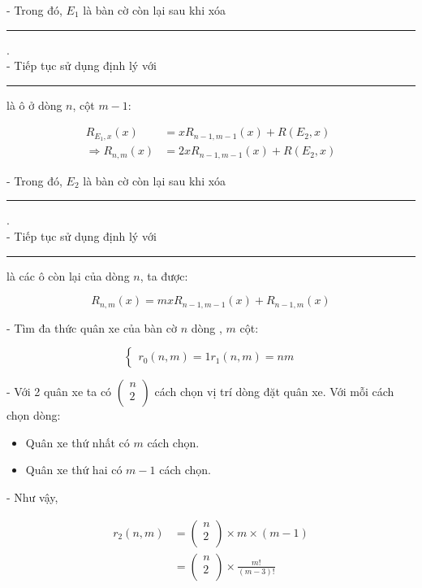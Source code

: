 \documentclass[12pt]{article}
\newcommand\crule[3][black]{\textcolor{#1}{\rule{#2}{#3}}}
\begin{document}
\begin{sloppypar}
- Trong đó, \(E_{1}\) là bàn cờ còn lại sau khi xóa \crule[cyan]{0.3cm}{0.3cm}. \\
- Tiếp tục sử dụng định lý với \crule[cyan]{0.3cm}{0.3cm} là ô ở dòng \(n\), cột \(m-1\): 

\begin{align*}
    R_{E_{1},x}(x) & = xR_{n-1,m-1}(x) + R(E_{2},x) \\
    \Rightarrow R_{n,m}(x) & = 2xR_{n-1,m-1}(x) + R(E_{2},x) 
\end{align*}

- Trong đó, \(E_{2}\) là bàn cờ còn lại sau khi xóa \crule[cyan]{0.3cm}{0.3cm}. \\
- Tiếp tục sử dụng định lý với \crule[cyan]{0.3cm}{0.3cm} là các ô còn lại của dòng \(n\), ta được:

\begin{equation*}
    R_{n,m}(x) = mxR_{n-1,m-1}(x) + R_{n-1,m}(x)
\end{equation*}

- Tìm đa thức quân xe của bàn cờ \(n\) dòng , \(m\) cột:

\[
    \begin{cases}
        r_{0}(n,m) = 1
        r_{1}(n,m) = nm
    \end{cases}
    \]

- Với 2 quân xe ta có \( \begin{pmatrix} n \\ 2 \\ \end{pmatrix} \) cách chọn vị trí dòng đặt quân xe. Với mỗi cách chọn dòng:

\begin{itemize}
    \item Quân xe thứ nhất có \(m\) cách chọn.
    \item Quân xe thứ hai có \(m-1\) cách chọn.
\end{itemize}

- Như vậy,

\begin{align*}
    r_{2}(n,m)  & = \begin{pmatrix} n \\ 2 \\ \end{pmatrix} \times  m \times (m-1) \\
                & = \begin{pmatrix} n \\ 2 \\ \end{pmatrix} \times  \frac{m!}{(m-3)!}
\end{align*}


\end{sloppypar}
\end{document}
